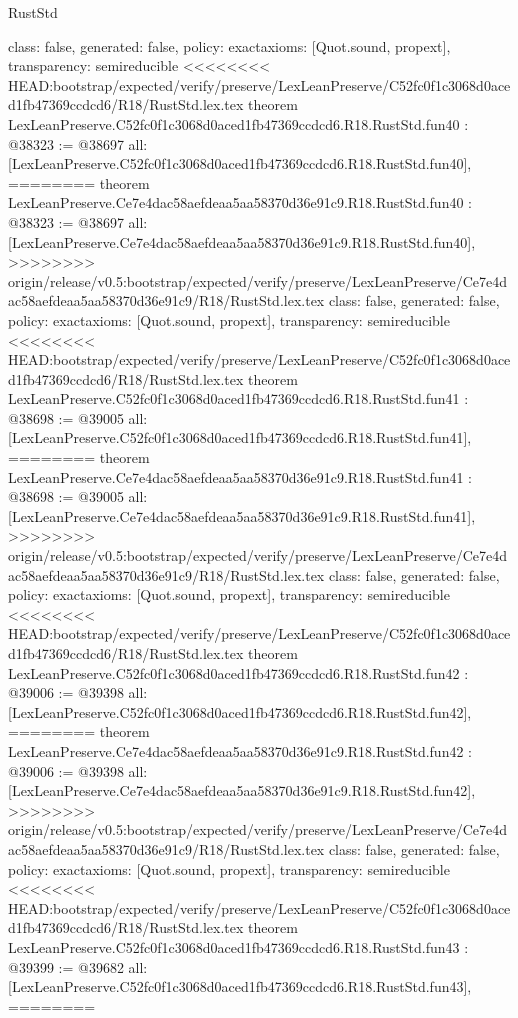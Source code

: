 \begin{lexlean}{RustStd}
\begin{coremodule}
{\begin{coremodule}
{{{{{{{{{{{{{{{{{{{{{{{{{{{{{{{{{{{{{{{{{{{  class: false,
  generated: false,
  policy: exact{axioms: [Quot.sound, propext]},
  transparency: semireducible
}
<<<<<<<< HEAD:bootstrap/expected/verify/preserve/LexLeanPreserve/C52fc0f1c3068d0aced1fb47369ccdcd6/R18/RustStd.lex.tex
theorem LexLeanPreserve.C52fc0f1c3068d0aced1fb47369ccdcd6.R18.RustStd.fun40 : @38323 := @38697 {
  all: [LexLeanPreserve.C52fc0f1c3068d0aced1fb47369ccdcd6.R18.RustStd.fun40],
========
theorem LexLeanPreserve.Ce7e4dac58aefdeaa5aa58370d36e91c9.R18.RustStd.fun40 : @38323 := @38697 {
  all: [LexLeanPreserve.Ce7e4dac58aefdeaa5aa58370d36e91c9.R18.RustStd.fun40],
>>>>>>>> origin/release/v0.5:bootstrap/expected/verify/preserve/LexLeanPreserve/Ce7e4dac58aefdeaa5aa58370d36e91c9/R18/RustStd.lex.tex
  class: false,
  generated: false,
  policy: exact{axioms: [Quot.sound, propext]},
  transparency: semireducible
}
<<<<<<<< HEAD:bootstrap/expected/verify/preserve/LexLeanPreserve/C52fc0f1c3068d0aced1fb47369ccdcd6/R18/RustStd.lex.tex
theorem LexLeanPreserve.C52fc0f1c3068d0aced1fb47369ccdcd6.R18.RustStd.fun41 : @38698 := @39005 {
  all: [LexLeanPreserve.C52fc0f1c3068d0aced1fb47369ccdcd6.R18.RustStd.fun41],
========
theorem LexLeanPreserve.Ce7e4dac58aefdeaa5aa58370d36e91c9.R18.RustStd.fun41 : @38698 := @39005 {
  all: [LexLeanPreserve.Ce7e4dac58aefdeaa5aa58370d36e91c9.R18.RustStd.fun41],
>>>>>>>> origin/release/v0.5:bootstrap/expected/verify/preserve/LexLeanPreserve/Ce7e4dac58aefdeaa5aa58370d36e91c9/R18/RustStd.lex.tex
  class: false,
  generated: false,
  policy: exact{axioms: [Quot.sound, propext]},
  transparency: semireducible
}
<<<<<<<< HEAD:bootstrap/expected/verify/preserve/LexLeanPreserve/C52fc0f1c3068d0aced1fb47369ccdcd6/R18/RustStd.lex.tex
theorem LexLeanPreserve.C52fc0f1c3068d0aced1fb47369ccdcd6.R18.RustStd.fun42 : @39006 := @39398 {
  all: [LexLeanPreserve.C52fc0f1c3068d0aced1fb47369ccdcd6.R18.RustStd.fun42],
========
theorem LexLeanPreserve.Ce7e4dac58aefdeaa5aa58370d36e91c9.R18.RustStd.fun42 : @39006 := @39398 {
  all: [LexLeanPreserve.Ce7e4dac58aefdeaa5aa58370d36e91c9.R18.RustStd.fun42],
>>>>>>>> origin/release/v0.5:bootstrap/expected/verify/preserve/LexLeanPreserve/Ce7e4dac58aefdeaa5aa58370d36e91c9/R18/RustStd.lex.tex
  class: false,
  generated: false,
  policy: exact{axioms: [Quot.sound, propext]},
  transparency: semireducible
}
<<<<<<<< HEAD:bootstrap/expected/verify/preserve/LexLeanPreserve/C52fc0f1c3068d0aced1fb47369ccdcd6/R18/RustStd.lex.tex
theorem LexLeanPreserve.C52fc0f1c3068d0aced1fb47369ccdcd6.R18.RustStd.fun43 : @39399 := @39682 {
  all: [LexLeanPreserve.C52fc0f1c3068d0aced1fb47369ccdcd6.R18.RustStd.fun43],
========
}}}}}}}}}}}}}}}}}}}}}}}}}}}}}}}}}}}}}}}}}}}}}}
\end{coremodule}}
\end{coremodule}
\end{lexlean}
